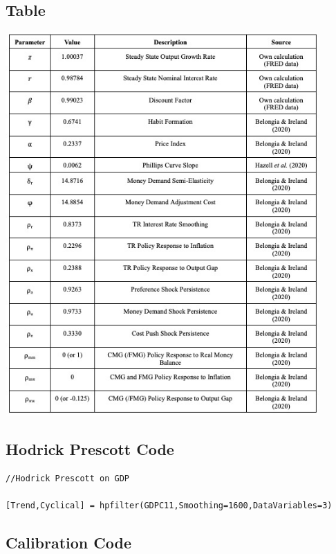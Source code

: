 \documentclass[11pt,preprint, authoryear]{elsarticle}
\let\origfigure\figure
\let\endorigfigure\endfigure
\renewenvironment{figure}[1][2] {
    \expandafter\origfigure\expandafter[H]
} {
    \endorigfigure
}
\numberwithin{equation}{section}
\numberwithin{figure}{section}
\numberwithin{table}{section}
\begin{document}
\newpage

\hypertarget{table}{%
\subsection{Table}\label{table}}

\begin{figure}
\centering
\includegraphics[width=0.9\textwidth,height=0.7\textheight]{./figures/table-param.jpeg}
\caption{Parameter Values}
\end{figure}

\newpage

\hypertarget{hodrick-prescott-code}{%
\subsection{Hodrick Prescott Code}\label{hodrick-prescott-code}}

\begin{verbatim}
//Hodrick Prescott on GDP

[Trend,Cyclical] = hpfilter(GDPC11,Smoothing=1600,DataVariables=3)
\end{verbatim}

\hypertarget{calibration-code}{%
\subsection{Calibration Code}\label{calibration-code}}
\end{document}
